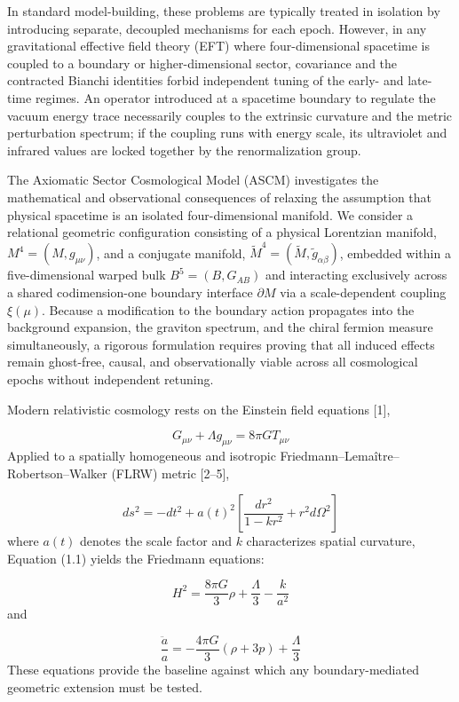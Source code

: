 \documentclass[aps,prd,onecolumn,superscriptaddress,nofootinbib,longbibliography,10pt]{revtex4-2}
\begin{document}
  In standard model-building, these problems are typically treated in isolation by introducing separate, decoupled mechanisms for each epoch. However, in any gravitational effective field theory (EFT) where four-dimensional spacetime is coupled to a boundary or higher-dimensional sector, covariance and the contracted Bianchi identities forbid independent tuning of the early- and late-time regimes. An operator introduced at a spacetime boundary to regulate the vacuum energy trace necessarily couples to the extrinsic curvature and the metric perturbation spectrum; if the coupling runs with energy scale, its ultraviolet and infrared values are locked together by the renormalization group.


  The Axiomatic Sector Cosmological Model (ASCM) investigates the mathematical and observational consequences of relaxing the assumption that physical spacetime is an isolated four-dimensional manifold. We consider a relational geometric configuration consisting of a physical Lorentzian manifold, \(M^4 = (M, g_{\mu\nu})\), and a conjugate manifold, \(\tilde{M}^4 = (\tilde{M}, \tilde{g}_{\alpha\beta})\), embedded within a five-dimensional warped bulk \(B^5 = (B, G_{AB})\) and interacting exclusively across a shared codimension-one boundary interface \(\partial M\) via a scale-dependent coupling \(\xi(\mu)\). Because a modification to the boundary action propagates into the background expansion, the graviton spectrum, and the chiral fermion measure simultaneously, a rigorous formulation requires proving that all induced effects remain ghost-free, causal, and observationally viable across all cosmological epochs without independent retuning.


  Modern relativistic cosmology rests on the Einstein field equations [1],


  \[ G_{\mu\nu} + \Lambda g_{\mu\nu} = 8\pi G T_{\mu\nu} \]
  Applied to a spatially homogeneous and isotropic Friedmann–Lemaître–Robertson–Walker (FLRW) metric [2–5],


  \[ ds^2 = -dt^2 + a(t)^2 \left[ \frac{dr^2}{1 - kr^2} + r^2 d\Omega^2 \right] \]
  where \(a(t)\) denotes the scale factor and \(k\) characterizes spatial curvature, Equation (1.1) yields the Friedmann equations:


  \[ H^2 = \frac{8\pi G}{3}\rho + \frac{\Lambda}{3} - \frac{k}{a^2} \]
  and


  \[ \frac{\ddot{a}}{a} = -\frac{4\pi G}{3}(\rho + 3p) + \frac{\Lambda}{3} \]
  These equations provide the baseline against which any boundary-mediated geometric extension must be tested.
\end{document}
